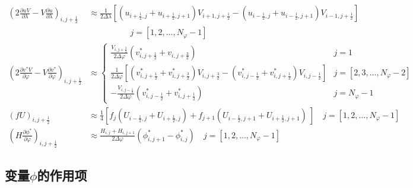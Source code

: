 \documentclass{ctexart}
\begin{document}
\begin{align}
  \left( 2 \frac{\partial u V}{\partial \lambda} - V \frac{\partial u}{\partial \lambda} \right)_{i,j+\frac{1}{2}} & \approx \frac{1}{2 \Delta{\lambda}} \left[ \left( u_{i+\frac{1}{2},j} + u_{i+\frac{1}{2},j+1} \right) V_{i+1,j+\frac{1}{2}}  - \left( u_{i-\frac{1}{2},j} + u_{i-\frac{1}{2},j+1} \right) V_{i-1,j+\frac{1}{2}} \right] \nonumber \\
  & \quad\quad\quad\quad\quad j = [1,2,\dots,N_\varphi - 1] \\
  \left( 2 \frac{\partial v^* V}{\partial \varphi} - V \frac{\partial v^*}{\partial \varphi} \right)_{i,j+\frac{1}{2}} & \approx \left\{
    \begin{array}{ll}
      \frac{V_{i,j+\frac{3}{2}}}{2 \Delta{\varphi}} \left( v_{i,j+\frac{1}{2}}^* + v_{i,j+\frac{3}{2}} \right) & j = 1 \\
      \frac{1}{2 \Delta{\varphi}} \left[ \left( v_{i,j+\frac{1}{2}}^* + v_{i,j+\frac{3}{2}}^* \right) V_{i,j+\frac{3}{2}} - \left( v_{i,j-\frac{1}{2}}^* + v_{i,j+\frac{1}{2}}^* \right) V_{i,j-\frac{1}{2}} \right] & j = [2,3,\dots,N_\varphi - 2] \\
      - \frac{V_{i,j-\frac{1}{2}}}{2 \Delta{\varphi}} \left( v_{i,j-\frac{1}{2}}^* + v_{i,j+\frac{1}{2}}^* \right) & j = N_\varphi - 1
    \end{array}
  \right. \\
  \left( f U \right)_{i,j+\frac{1}{2}} & \approx \frac{1}{4} \left[ f_{j} \left( U_{i-\frac{1}{2},j} + U_{i+\frac{1}{2},j} \right) + f_{j+1} \left( U_{i-\frac{1}{2},j+1} + U_{i+\frac{1}{2},j+1} \right) \ \right] \quad j = [1, 2, \dots, N_\varphi - 1] \\
  \left( H \frac{\partial \phi^*}{\partial \varphi} \right)_{i,j+\frac{1}{2}} & \approx \frac{H_{i,j} + H_{i,j+1}}{2 \Delta{\varphi}} \left( \phi_{i,j+1}^* - \phi_{i,j}^* \right) \quad j = [1, 2, \dots, N_\varphi - 1]
\end{align}

\subsection{变量$\phi$的作用项}
\end{document}
